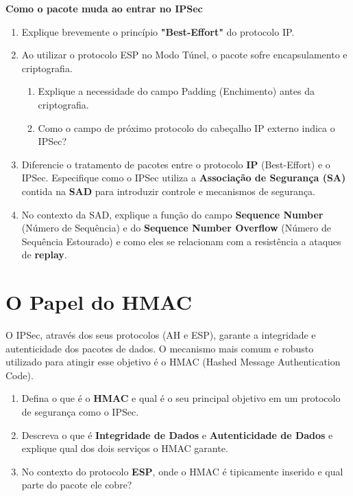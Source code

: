 \textbf{Como o pacote muda ao entrar no IPSec}
\begin{enumerate}
    \item Explique brevemente o princípio \textbf{"Best-Effort"} do protocolo IP.
    \item Ao utilizar o protocolo ESP no Modo Túnel, o pacote sofre encapsulamento e criptografia.
          \begin{enumerate}
              \item Explique a necessidade do campo Padding (Enchimento) antes da criptografia.
              \item Como o campo de próximo protocolo do cabeçalho IP externo indica o IPSec?
          \end{enumerate}
    \item Diferencie o tratamento de pacotes entre o protocolo \textbf{IP} (Best-Effort) e o IPSec. Especifique como o IPSec utiliza a \textbf{Associação de Segurança (SA)} contida na \textbf{SAD} para introduzir controle e mecanismos de segurança.
    \item No contexto da SAD, explique a função do campo \textbf{Sequence Number} (Número de Sequência) e do \textbf{Sequence Number Overflow} (Número de Sequência Estourado) e como eles se relacionam com a resistência a ataques de \textbf{replay}.
\end{enumerate}

\section{O Papel do HMAC}
O IPSec, através dos seus protocolos (AH e ESP), garante a integridade e autenticidade dos pacotes de dados. O mecanismo mais comum e robusto utilizado para atingir esse objetivo é o HMAC (Hashed Message Authentication Code).

\begin{enumerate}
    \item Defina o que é o \textbf{HMAC} e qual é o seu principal objetivo em um protocolo de segurança como o IPSec.
    \item Descreva o que é \textbf{Integridade de Dados} e \textbf{Autenticidade de Dados} e explique qual dos dois serviços o HMAC garante.
    \item No contexto do protocolo \textbf{ESP}, onde o HMAC é tipicamente inserido e qual parte do pacote ele cobre?
\end{enumerate}


